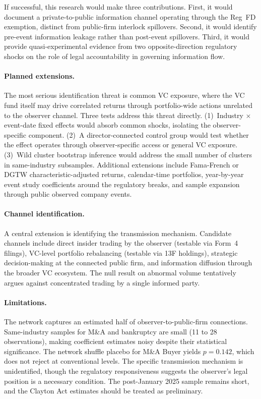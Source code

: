 \documentclass[12pt]{article}
\begin{document}
If successful, this research would make three contributions. First, it would document a private-to-public information channel operating through the Reg~FD exemption, distinct from public-firm interlock spillovers. Second, it would identify pre-event information leakage rather than post-event spillovers. Third, it would provide quasi-experimental evidence from two opposite-direction regulatory shocks on the role of legal accountability in governing information flow.

\paragraph{Planned extensions.} The most serious identification threat is common VC exposure, where the VC fund itself may drive correlated returns through portfolio-wide actions unrelated to the observer channel. Three tests address this threat directly. (1)~Industry $\times$ event-date fixed effects would absorb common shocks, isolating the observer-specific component. (2)~A director-connected control group would test whether the effect operates through observer-specific access or general VC exposure. (3)~Wild cluster bootstrap inference would address the small number of clusters in same-industry subsamples. Additional extensions include Fama-French or DGTW characteristic-adjusted returns, calendar-time portfolios, year-by-year event study coefficients around the regulatory breaks, and sample expansion through public observed company events.

\paragraph{Channel identification.} A central extension is identifying the transmission mechanism. Candidate channels include direct insider trading by the observer (testable via Form~4 filings), VC-level portfolio rebalancing (testable via 13F holdings), strategic decision-making at the connected public firm, and information diffusion through the broader VC ecosystem. The null result on abnormal volume tentatively argues against concentrated trading by a single informed party.

\paragraph{Limitations.} The network captures an estimated half of observer-to-public-firm connections. Same-industry samples for M\&A and bankruptcy are small (11 to 28 observations), making coefficient estimates noisy despite their statistical significance. The network shuffle placebo for M\&A Buyer yields $p=0.142$, which does not reject at conventional levels. The specific transmission mechanism is unidentified, though the regulatory responsiveness suggests the observer's legal position is a necessary condition. The post-January 2025 sample remains short, and the Clayton Act estimates should be treated as preliminary.

\newpage


\end{document}

